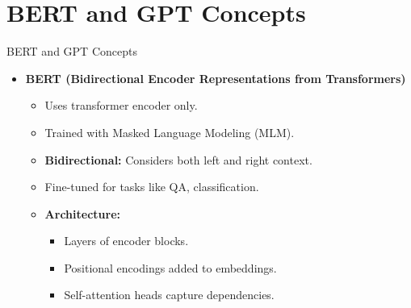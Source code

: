 \section{BERT and GPT Concepts}
\begin{frame}[allowframebreaks]{BERT and GPT Concepts}
    \begin{itemize}
        \item \textbf{BERT (Bidirectional Encoder Representations from Transformers)}
        \begin{itemize}
            \item Uses transformer encoder only.
            \item Trained with Masked Language Modeling (MLM).
            \item \textbf{Bidirectional:} Considers both left and right context.
            \item Fine-tuned for tasks like QA, classification.
            \item \textbf{Architecture:}
            \begin{itemize}
                \item Layers of encoder blocks.
                \item Positional encodings added to embeddings.
                \item Self-attention heads capture dependencies.
            \end{itemize}
        \end{itemize}
    \end{itemize}
\framebreak


\end{frame}

